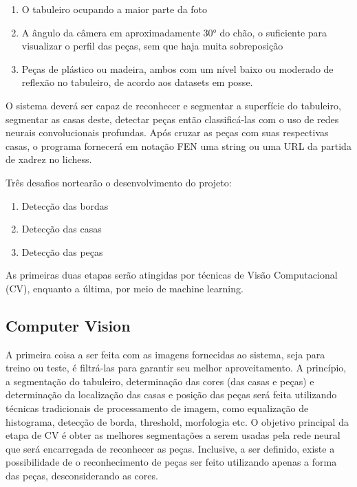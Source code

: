 \documentclass[a4paper,12pt,twoside]{article}
\begin{document}
\begin{enumerate}
    \item{O tabuleiro ocupando a maior parte da foto}
    \item{A ângulo da câmera em aproximadamente 30° do chão, o suficiente para visualizar o perfil das peças, sem que haja muita sobreposição}
    \item{Peças de plástico ou madeira, ambos com um nível baixo ou moderado de reflexão no tabuleiro, de acordo aos datasets em posse.}
\end{enumerate}

O sistema deverá ser capaz de reconhecer e segmentar a superfície do tabuleiro, segmentar as casas deste, detectar peças então classificá-las com o uso de redes neurais convolucionais profundas. 
Após cruzar as peças com suas respectivas casas, o programa fornecerá em notação FEN uma string ou uma URL da partida de xadrez no lichess.

Três desafios nortearão o desenvolvimento do projeto:

\begin{enumerate}
    \item{Detecção das bordas}
    \item{Detecção das casas}
    \item{Detecção das peças}
\end{enumerate}

As primeiras duas etapas serão atingidas por técnicas de Visão Computacional (CV), enquanto a última, por meio de machine learning.

\subsection{Computer Vision}

A primeira coisa a ser feita com as imagens fornecidas ao sistema, seja para treino ou teste, é filtrá-las para garantir seu melhor aproveitamento.
A princípio, a segmentação do tabuleiro, determinação das cores (das casas e peças) e determinação da localização das casas e posição das peças será feita utilizando técnicas tradicionais de processamento de imagem, como equalização de histograma, detecção de borda, threshold, morfologia etc. O objetivo principal da etapa de CV é obter as melhores segmentações a serem usadas pela rede neural que será encarregada de reconhecer as peças. Inclusive, a ser definido, existe a possibilidade de o reconhecimento de peças ser feito utilizando apenas a forma das peças, desconsiderando as cores.
\end{document}
